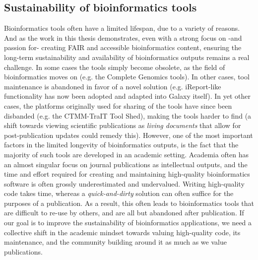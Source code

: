 \subsection{Sustainability of bioinformatics tools}
Bioinformatics tools often have a limited lifespan, due to a variety of reasons.
And as the work in this thesis demonstrates, even with a strong focus on -and passion for- creating FAIR and accessible bioinformatics content, ensuring the long-term sustainability and availability of bioinformatics outputs remains a real challenge. In some cases the tools simply become obsolete, as the field of bioinformatics moves on (e.g. the Complete Genomics tools).
In other cases, tool maintenance is abandoned in favor of a novel solution (e.g. iReport-like functionality has now been adopted and adapted into Galaxy itself).
In yet other cases, the platforms originally used for sharing of the tools have since been disbanded (e.g. the CTMM-TraIT Tool Shed), making the tools harder to find (a shift towards viewing scientific publications as \emph{living documents} that allow for post-publication updates could remedy this).
However, one of the most important factors in the limited longevity of bioinformatics outputs, is the fact that the majority of such tools are developed in an academic setting. Academia often has an almost singular focus on journal publications as intellectual outputs, and the time and effort required for creating and maintaining high-quality bioinformatics software is often grossly underestimated and undervalued. Writing high-quality code takes time, whereas a \emph{quick-and-dirty} solution can often suffice for the purposes of a publication. As a result, this often leads to bioinformatics tools that are difficult to re-use by others, and are all but abandoned after publication.
If our goal is to improve the sustainability of bioinformatics applications, we need a collective shift in the academic mindset towards valuing high-quality code, its maintenance, and the community building around it as much as we value publications.



